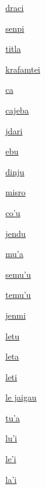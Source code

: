{\hyperlink{val:draci}{draci}}{}{}{}

{\hyperlink{val:senpi}{senpi}}{}{}{}

{\hyperlink{val:titla}{titla}}{}{}{}

{\hyperlink{val:krafamtei}{krafamtei}}{}{}{}

{\hyperlink{val:ca}{ca}}{}{}{}

{\hyperlink{val:cajeba}{cajeba}}{}{}{}

{\hyperlink{val:jdari}{jdari}}{}{}{}

{\hyperlink{val:ebu}{ebu}}{}{}{}

{\hyperlink{val:dinju}{dinju}}{}{}{}

{\hyperlink{val:misro}{misro}}{}{}{}

{\hyperlink{val:cohu}{co'u}}{}{}{}

{\hyperlink{val:jendu}{jendu}}{}{}{}

{\hyperlink{val:muha}{mu'a}}{}{}{}

{\hyperlink{val:semuhu}{semu'u}}{}{}{}

{\hyperlink{val:temuhu}{temu'u}}{}{}{}

{\hyperlink{val:jenmi}{jenmi}}{}{}{}

{\hyperlink{val:letu}{letu}}{}{}{}

{\hyperlink{val:leta}{leta}}{}{}{}

{\hyperlink{val:leti}{leti}}{}{}{}

{\hyperlink{val:le jaigau}{le jaigau}}{}{}{}

{\hyperlink{val:tuha}{tu'a}}{}{}{}

{\hyperlink{val:luhi}{lu'i}}{}{}{}

{\hyperlink{val:lehi}{le'i}}{}{}{}

{\hyperlink{val:lahi}{la'i}}{}{}{}

